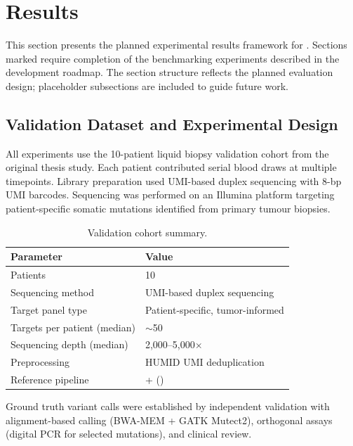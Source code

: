 \section{Results}
\label{sec:results}

This section presents the planned experimental results framework for \kmerdet{}.
Sections marked  require completion of the benchmarking experiments
described in the development roadmap.  The section structure reflects the planned
evaluation design; placeholder subsections are included to guide future work.

\subsection{Validation Dataset and Experimental Design}
\label{sec:results-dataset}

All experiments use the 10-patient liquid biopsy validation cohort from the
original thesis study.  Each patient contributed serial blood draws at multiple
timepoints.  Library preparation used UMI-based duplex sequencing with 8-bp
UMI barcodes.  Sequencing was performed on an Illumina platform targeting
patient-specific somatic mutations identified from primary tumour biopsies.

\begin{table}[h]
  \centering
  \caption{Validation cohort summary.}
  \label{tab:cohort}
  \begin{tabular}{ll}
    \toprule
    Parameter & Value \\
    \midrule
    Patients & 10 \\
    Sequencing method & UMI-based duplex sequencing \\
    Target panel type & Patient-specific, tumor-informed \\
    Targets per patient (median) & $\sim$50 \\
    Sequencing depth (median) & 2,000--5,000$\times$ \\
    Preprocessing & HUMID UMI deduplication \\
    Reference pipeline & \km{} + \kmtools{} (\kam{}) \\
    \bottomrule
  \end{tabular}
\end{table}

Ground truth variant calls were established by independent validation with
alignment-based calling (BWA-MEM + GATK Mutect2), orthogonal assays (digital
PCR for selected mutations), and clinical review.


